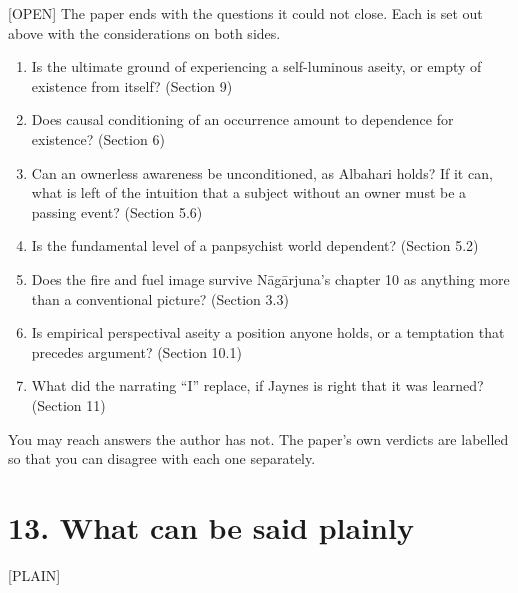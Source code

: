 \documentclass[11pt]{article}
\newcommand{\register}[1]{{\ttfamily\small #1}}
\begin{document}
\register{[OPEN]} The paper ends with the questions it could not close. Each is set out above with the considerations on both sides.

\begin{enumerate}
\item Is the ultimate ground of experiencing a self-luminous aseity, or empty of existence from itself? (Section 9)
\item Does causal conditioning of an occurrence amount to dependence for existence? (Section 6)
\item Can an ownerless awareness be unconditioned, as Albahari holds? If it can, what is left of the intuition that a subject without an owner must be a passing event? (Section 5.6)
\item Is the fundamental level of a panpsychist world dependent? (Section 5.2)
\item Does the fire and fuel image survive Nāgārjuna's chapter 10 as anything more than a conventional picture? (Section 3.3)
\item Is empirical perspectival aseity a position anyone holds, or a temptation that precedes argument? (Section 10.1)
\item What did the narrating ``I'' replace, if Jaynes is right that it was learned? (Section 11)
\end{enumerate}
You may reach answers the author has not. The paper's own verdicts are labelled so that you can disagree with each one separately.

\section*{13. What can be said plainly}

\register{[PLAIN]}
\end{document}
